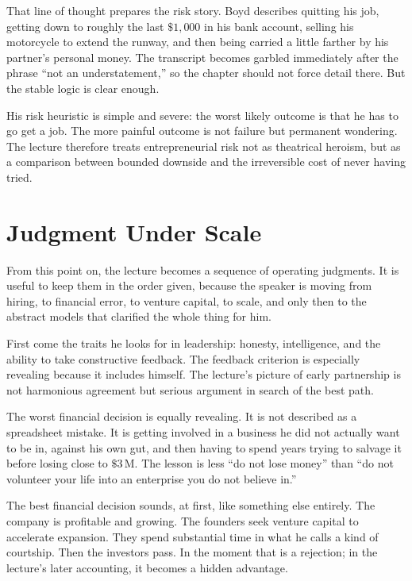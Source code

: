 That line of thought prepares the risk story. Boyd describes quitting his job, getting down to roughly the last \(\$1{,}000\) in his bank account, selling his motorcycle to extend the runway, and then being carried a little farther by his partner's personal money. The transcript becomes garbled immediately after the phrase ``not an understatement,'' so the chapter should not force detail there. But the stable logic is clear enough.

His risk heuristic is simple and severe: the worst likely outcome is that he has to go get a job. The more painful outcome is not failure but permanent wondering. The lecture therefore treats entrepreneurial risk not as theatrical heroism, but as a comparison between bounded downside and the irreversible cost of never having tried.

\section{Judgment Under Scale}

From this point on, the lecture becomes a sequence of operating judgments. It is useful to keep them in the order given, because the speaker is moving from hiring, to financial error, to venture capital, to scale, and only then to the abstract models that clarified the whole thing for him.

First come the traits he looks for in leadership: honesty, intelligence, and the ability to take constructive feedback. The feedback criterion is especially revealing because it includes himself. The lecture's picture of early partnership is not harmonious agreement but serious argument in search of the best path.

The worst financial decision is equally revealing. It is not described as a spreadsheet mistake. It is getting involved in a business he did not actually want to be in, against his own gut, and then having to spend years trying to salvage it before losing close to \(\$3\,\mathrm{M}\). The lesson is less ``do not lose money'' than ``do not volunteer your life into an enterprise you do not believe in.''

The best financial decision sounds, at first, like something else entirely. The company is profitable and growing. The founders seek venture capital to accelerate expansion. They spend substantial time in what he calls a kind of courtship. Then the investors pass. In the moment that is a rejection; in the lecture's later accounting, it becomes a hidden advantage.


